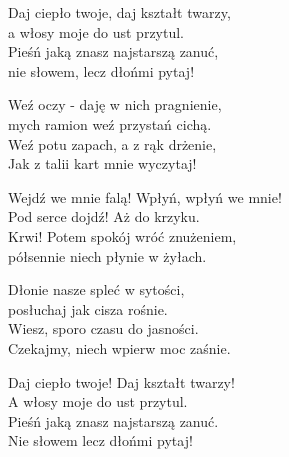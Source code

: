 \begin{text}
    Daj ciepło twoje, daj kształt twarzy,\\
    a włosy moje do ust przytul.\\
    Pieśń jaką znasz najstarszą zanuć,\\
    nie słowem, lecz dłońmi pytaj!

    Weź oczy - daję w nich pragnienie,\\
    mych ramion weź przystań cichą.\\
    Weź potu zapach, a z rąk drżenie,\\
    Jak z talii kart mnie wyczytaj!

    Wejdź we mnie falą! Wpłyń, wpłyń we mnie!\\
    Pod serce dojdź! Aż do krzyku.\\
    Krwi! Potem spokój wróć znużeniem,\\
    półsennie niech płynie w żyłach.

    Dłonie nasze spleć w sytości,\\
    posłuchaj jak cisza rośnie.\\
    Wiesz, sporo czasu do jasności.\\
    Czekajmy, niech wpierw moc zaśnie.

    Daj ciepło twoje! Daj kształt twarzy!\\
    A włosy moje do ust przytul.\\
    Pieśń jaką znasz najstarszą zanuć.\\
    Nie słowem lecz dłońmi pytaj!
\end{text}
\begin{chord}

\end{chord}